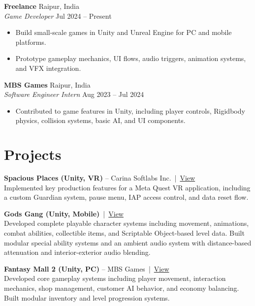 \documentclass[a4paper,10pt]{article}
\begin{document}
{\textbf{Freelance}} \hfill Raipur, India\\[1pt]
\textit{Game Developer} \hfill Jul 2024 -- Present
\begin{itemize}[leftmargin=15pt,itemsep=1pt,topsep=1pt,parsep=0pt,partopsep=0pt]
  \item Build small-scale games in Unity and Unreal Engine for PC and mobile platforms.
  \item Prototype gameplay mechanics, UI flows, audio triggers, animation systems, and VFX integration.
\end{itemize}
\vspace{4pt}

{\textbf{MBS Games}} \hfill Raipur, India\\[1pt]
\textit{Software Engineer Intern} \hfill Aug 2023 -- Jul 2024
\begin{itemize}[leftmargin=15pt,itemsep=1pt,topsep=1pt,parsep=0pt,partopsep=0pt]
  \item Contributed to game features in Unity, including player controls, Rigidbody physics, collision systems, basic AI, and UI components.
\end{itemize}
\vspace{4pt}

\section*{Projects}
\textbf{Spacious Places (Unity, VR)} -- Carina Softlabs Inc. \,|\, \href{https://www.meta.com/experiences/spacious-places/8410008925778451/}{View}\\[1pt]
Implemented key production features for a Meta Quest VR application, including a custom Guardian system, pause menu, IAP access control, and data reset flow.
\vspace{4pt}

\textbf{Gods Gang (Unity, Mobile)} \,|\, \href{https://play.google.com/store/apps/details?id=com.techymaugames.godsgang&hl=en_IN}{View}\\[1pt]
Developed complete playable character systems including movement, animations, combat abilities, collectible items, and Scriptable Object-based level data. Built modular special ability systems and an ambient audio system with distance-based attenuation and interior-exterior audio blending.
\vspace{4pt}

\textbf{Fantasy Mall 2 (Unity, PC)} -- MBS Games \,|\, \href{https://rahulmartin.itch.io/fantasymall2}{View}\\[1pt]
Developed core gameplay systems including player movement, interaction mechanics, shop management, customer AI behavior, and economy balancing. Built modular inventory and level progression systems.
\vspace{4pt}
\end{document}
